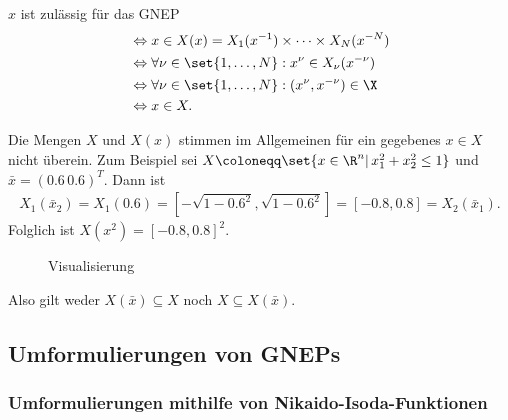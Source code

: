 \begin{beweis}
  $x$ ist zulässig für das GNEP 
  \begin{align*}
    &\Leftrightarrow x \in X(x) = X_{1}(x^{-1}) \times \dots \times X_{N}(x^{-N})\\
    &\Leftrightarrow \forall \nu \in \set{1, \dots, N}: x^{\nu} \in X_{\nu}(x^{-\nu})\\
    &\Leftrightarrow \forall \nu \in \set{1, \dots, N}: (x^{\nu}, x^{-\nu}) \in \X\\
    &\Leftrightarrow x \in X. 
  \end{align*}
\end{beweis}
\begin{bemerkung*}
  Die Mengen $X$ und $X(x)$ stimmen im Allgemeinen für ein gegebenes $x \in X$ nicht überein. Zum Beispiel sei $X \coloneqq \set{x \in \R^{n}|\, x_{1}^{2} + x_{2}^{2} \leq 1}$ und $\bar x = (0.6 \, 0.6)^{T}$. Dann ist
  \begin{align*}
    X_{1}(\bar x_{2}) = X_{1}(0.6) = [- \sqrt{1 - 0.6^{2}}, \sqrt{1 - 0.6^{2}}] = [-0.8, 0.8] = X_{2}(\bar x_{1}). 
  \end{align*}
Folglich ist $X(x^{2}) = [-0.8, 0.8]^{2}$. 
\begin{figure}[h!]
  \centering

  \caption{Visualisierung}
\end{figure}
Also gilt weder $X(\bar x ) \subseteq X$ noch $X \subseteq X(\bar x)$. 
\end{bemerkung*}

\subsection{Umformulierungen von GNEPs}
\label{sec:umform-von-gneps}

\subsubsection{Umformulierungen mithilfe von Nikaido-Isoda-Funktionen}
\label{sec:umform-mith-von}

